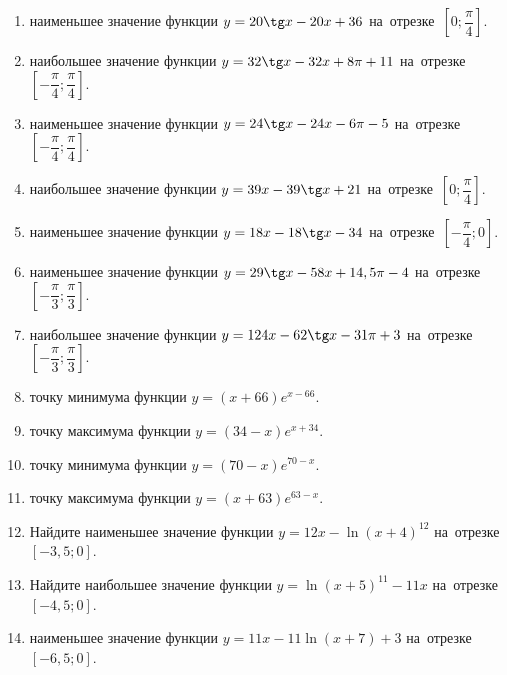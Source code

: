 \documentclass[a4paper,10pt]{article}
\begin{document}
\begin{enumerate}
\item {} наименьшее значение функции $y = 20\tg x-20x+36$ на~отрезке~$\left[0;\dfrac{\pi }{4}\right]$.

\item {} наибольшее значение функции $y=32\tg x-32x+8\pi +11$ на~отрезке~$\left[-\dfrac{\pi }{4};\dfrac{\pi }{4}\right]$.

\item {} наименьшее значение функции $y=24\tg x-24x-6\pi -5$ на~отрезке~$\left[-\dfrac{\pi }{4};\dfrac{\pi }{4}\right]$.

\item {} наибольшее значение функции $y = 39x-39\tg x +21$ на~отрезке~$\left[0;\dfrac{\pi }{4}\right]$.

\item {} наименьшее значение функции $y = 18x-18\tg x -34$ на~отрезке~$\left[-\dfrac{\pi }{4};0\right]$.

\item {} наименьшее значение функции $y = 29\tg x-58x+14,5 \pi -4$ на~отрезке~$\left[-\dfrac{\pi }{3};\dfrac{\pi }{3}\right]$.

\item {} наибольшее значение функции $y = 124x-62\tg x-31\pi +3$ на~отрезке~$\left[-\dfrac{\pi }{3};\dfrac{\pi }{3}\right]$.

\item {} точку минимума функции $y = \left(x+66\right)e^{x-66}$.

\item {} точку максимума функции $y = \left(34-x\right)e^{x+34}$.

\item {} точку минимума функции $y = \left(70-x\right)e^{70-x}$.

\item {} точку максимума функции $y = \left(x+63\right)e^{63-x}$.

\item Найдите наименьшее значение функции $y = 12x-\ln \left(x+4\right)^{12}$ на~отрезке~$\left[-3,5;0\right]$.

\item Найдите наибольшее значение функции $y = \ln \left(x+5\right)^{11}-11x$ на~отрезке~$\left[-4,5;0\right]$.

\item {} наименьшее значение функции $y = 11x-11\ln \left(x+7\right) +3$ на~отрезке~$\left[-6,5;0\right]$.


\end{enumerate}
\end{document}
